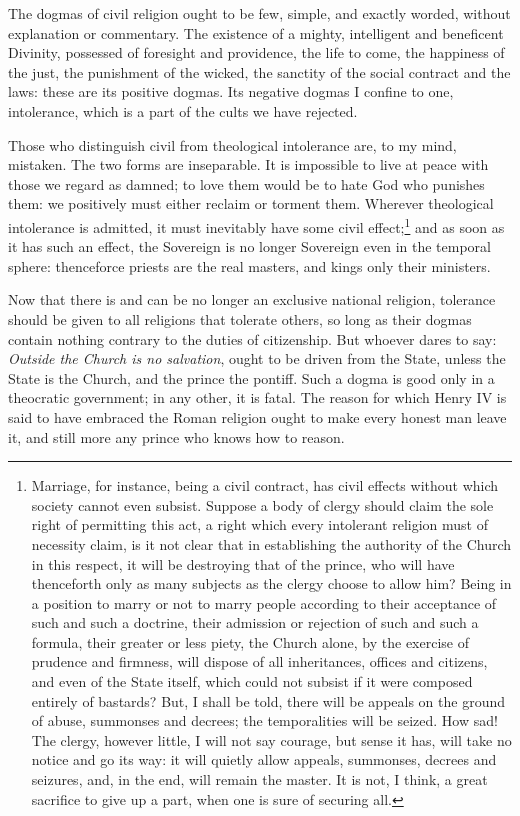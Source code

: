 \documentclass[12pt]{book}
\begin{document}
The dogmas of civil religion ought to be few, simple, and exactly worded, without explanation or commentary. The existence of a mighty, intelligent and beneficent Divinity, possessed of foresight and providence, the life to come, the happiness of the just, the punishment of the wicked, the sanctity of the social contract and the laws: these are its positive dogmas. Its negative dogmas I confine to one, intolerance, which is a part of the cults we have rejected.

Those who distinguish civil from theological intolerance are, to my mind, mistaken. The two forms are inseparable. It is impossible to live at peace with those we regard as damned; to love them would be to hate God who punishes them: we positively must either reclaim or torment them. Wherever theological intolerance is admitted, it must inevitably have some civil effect;\footnote{Marriage, for instance, being a civil contract, has civil effects without which society cannot even subsist. Suppose a body of clergy should claim the sole right of permitting this act, a right which every intolerant religion must of necessity claim, is it not clear that in establishing the authority of the Church in this respect, it will be destroying that of the prince, who will have thenceforth only as many subjects as the clergy choose to allow him? Being in a position to marry or not to marry people according to their acceptance of such and such a doctrine, their admission or rejection of such and such a formula, their greater or less piety, the Church alone, by the exercise of prudence and firmness, will dispose of all inheritances, offices and citizens, and even of the State itself, which could not subsist if it were composed entirely of bastards? But, I shall be told, there will be appeals on the ground of abuse, summonses and decrees; the temporalities will be seized. How sad! The clergy, however little, I will not say courage, but sense it has, will take no notice and go its way: it will quietly allow appeals, summonses, decrees and seizures, and, in the end, will remain the master. It is not, I think, a great sacrifice to give up a part, when one is sure of securing all.} and as soon as it has such an effect, the Sovereign is no longer Sovereign even in the temporal sphere: thenceforce priests are the real masters, and kings only their ministers.

Now that there is and can be no longer an exclusive national religion, tolerance should be given to all religions that tolerate others, so long as their dogmas contain nothing contrary to the duties of citizenship. But whoever dares to say: \textit{Outside the Church is no salvation}, ought to be driven from the State, unless the State is the Church, and the prince the pontiff. Such a dogma is good only in a theocratic government; in any other, it is fatal. The reason for which Henry IV is said to have embraced the Roman religion ought to make every honest man leave it, and still more any prince who knows how to reason.
\end{document}
